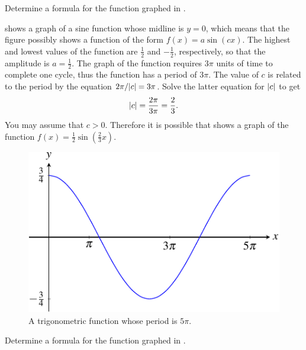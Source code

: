 \documentclass[a4paper,oneside,12pt]{article}
\begin{document}
\begin{example}
Determine a formula for the function graphed in
.
\end{example}

\begin{solution}
 shows a graph of a sine
function whose midline is $y = 0$, which means that the figure
possibly shows a function of the form $f(x) = a \sin(cx)$.  The
highest and lowest values of the function are $\frac{1}{2}$ and
$-\frac{1}{2}$, respectively, so that the amplitude is
$a = \frac{1}{2}$.  The graph of the function requires $3\pi$ units of
time to complete one cycle, thus the function has a period of $3\pi$.
The value of $c$ is related to the period by the equation
$2\pi / \lvert c\rvert = 3\pi$.  Solve the latter equation for
$\lvert c\rvert$ to get
\[
\lvert c\rvert
=
\frac{2\pi}{3\pi}
=
\frac{2}{3}.
\]
You may assume that $c > 0$.  Therefore it is possible that
 shows a graph of the function
$f(x) = \frac{1}{2} \sin(\frac{2}{3} x)$.
\end{solution}

\begin{figure}[!htbp]
\centering
\includegraphics[scale=1.1]{image/13/3quarter-cos-5pi.pdf}
\caption{%
  A trigonometric function whose period is $5\pi$.
}
\label{fig:trigonometric:3quarter_cos_5pi}
\end{figure}

\begin{exercise}
Determine a formula for the function graphed in
.
\end{exercise}
\end{document}
